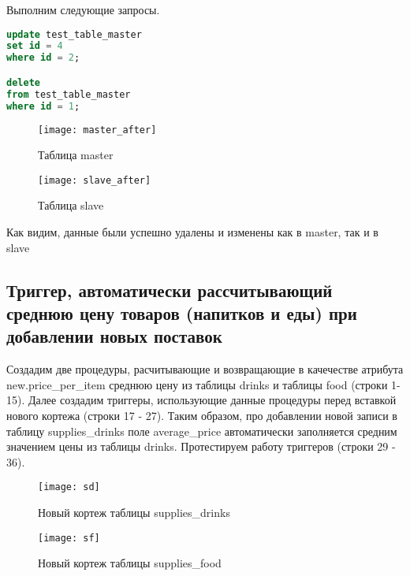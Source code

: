 Выполним следующие запросы.

\begin{lstlisting}[caption=Обновление и удаление данных из master, language=SQL]
update test_table_master
set id = 4
where id = 2;

delete
from test_table_master
where id = 1;
\end{lstlisting}

\begin{figure}[!htb]
	\texttt{[image: master\_after]}
	\caption{Таблица master}\label{fig:master_after}
	\endminipage\hfill
	\texttt{[image: slave\_after]}
	\caption{Таблица slave}\label{fig:slave_after}
	\endminipage\hfill
\end{figure}

Как видим, данные были успешно удалены и изменены как в master, так и в slave

\subsection{Триггер, автоматически рассчитывающий среднюю цену товаров (напитков и еды) при добавлении новых поставок}



Создадим две процедуры, расчитывающие и возвращающие в качечестве атрибута new.price\_per\_item среднюю цену из таблицы drinks и таблицы food (строки 1-15).
Далее создадим триггеры, использующие данные процедуры перед вставкой нового кортежа (строки 17 - 27).
Таким образом, про добавлении новой записи в таблицу supplies\_drinks поле average\_price автоматически заполняется средним значением цены из таблицы drinks.
Протестируем работу триггеров (строки 29 - 36).

\begin{figure}[H]
	\begin{center}
		\texttt{[image: sd]}
		\caption{Новый кортеж таблицы supplies\_drinks} 
		\label{pic:sf} %
	\end{center}
\end{figure}

\begin{figure}[H]
	\begin{center}
		\texttt{[image: sf]}
		\caption{Новый кортеж таблицы supplies\_food} 
		\label{pic:sd} %
	\end{center}
\end{figure}

